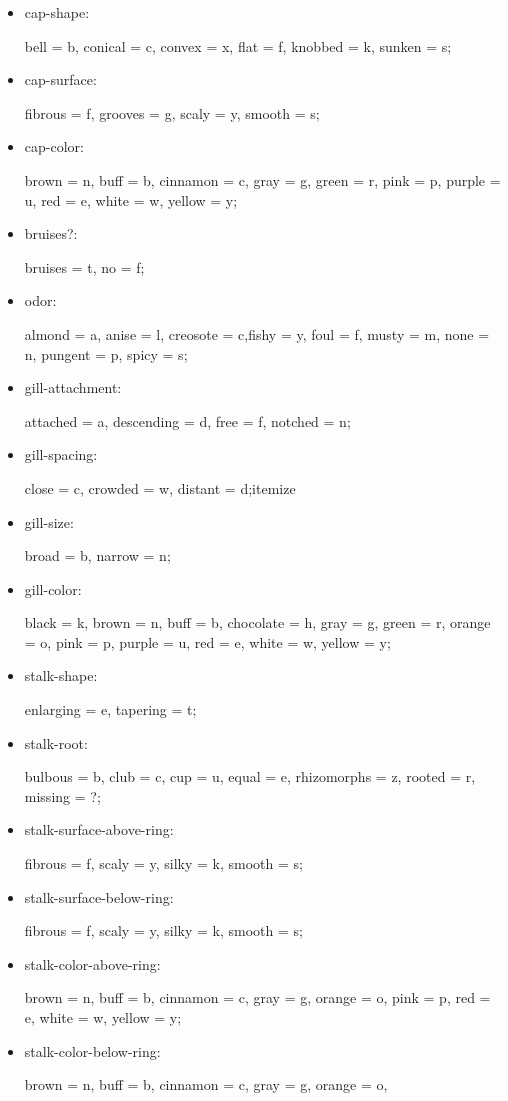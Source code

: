 \documentclass[12pt]{report}
\begin{document}
\begin{itemize}
  \item cap-shape: \par bell = b, conical = c, convex = x, flat = f,
  knobbed = k, sunken = s;
  \item cap-surface: \par fibrous = f, grooves = g, scaly = y, smooth = s;
  \item cap-color: \par brown = n, buff = b, cinnamon = c, gray = g, green = r, pink = p, purple = u, red = e, white = w, yellow = y;
  \item bruises?:         \par bruises = t, no = f;
  \item odor:  \par almond = a, anise = l, creosote = c,fishy = y, foul = f,
  musty = m, none = n, pungent = p, spicy = s;
  \item gill-attachment:  \par attached = a, descending = d, free = f, notched = n;
  \item gill-spacing:   \par close = c, crowded = w, distant = d;itemize
  \item gill-size:     \par broad = b, narrow = n;
  \item gill-color:    \par black = k, brown = n, buff = b, chocolate = h, gray = g, 
  green = r, orange = o, pink = p, purple = u, red = e, 
  white = w, yellow = y;
  \item stalk-shape:   \par            enlarging = e, tapering = t;
  \item stalk-root:     \par           bulbous = b, club = c, cup = u, equal = e, 
  rhizomorphs = z, rooted = r, missing = ?;
  \item stalk-surface-above-ring:\par  fibrous = f, scaly = y, silky = k, smooth = s;
  \item stalk-surface-below-ring:\par  fibrous = f, scaly = y, silky = k, smooth = s;
  \item stalk-color-above-ring:\par    brown = n, buff = b, cinnamon = c, gray = g, orange = o, 
  pink = p, red = e, white = w, yellow = y;
  \item stalk-color-below-ring: \par   brown = n, buff = b, cinnamon = c, gray = g, orange = o, 

\end{itemize}
\end{document}
